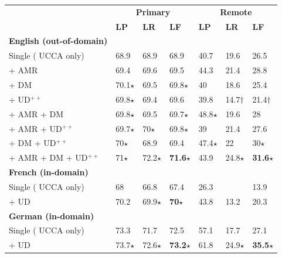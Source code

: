 \documentclass[a0,portrait]{a0poster}
\begin{document}
\begin{multicols}{2}
\begin{center}
\vspace{-1cm}
\setlength\tabcolsep{1cm}
\begin{tabular}{l|lll|lll}
& \multicolumn{3}{c|}{\bf\small Primary} & \multicolumn{3}{c}{\bf\small Remote} \\
& \textbf{\small LP} & \textbf{\small LR} & \textbf{LF}
& \textbf{\small LP} & \textbf{\small LR} & \textbf{LF} \\
\hline
\bf English (out-of-domain) & \\
Single ({\color{Indigo} UCCA} only)
& 68.9 & 68.9 & \large 68.9 & 40.7 & 19.6 & \large 26.5 \\
\cline{1-1}
+ \color{DarkGreen} AMR
& 69.4 & 69.6 & \large 69.5 & 44.3 & 21.4 & \large 28.8 \\
+ \color{DarkRed} DM
& 70.1$\star$ & 69.5 & {\large 69.8}$\star$ & 40 & 18.6 & \large 25.4 \\
+ \color{DarkBlue} UD$^{++}$
& 69.8$\star$ & 69.4 & \large 69.6 & 39.8 & 14.7$\dagger$ & {\large 21.4}$\dagger$ \\
+ {\color{DarkGreen} AMR} + \color{DarkRed} DM
& 69.8$\star$ & 69.5 & {\large 69.7}$\star$ & 48.8$\star$ & 19.6 & \large 28 \\
+ {\color{DarkGreen} AMR} + \color{DarkBlue} UD$^{++}$
& 69.7$\star$ & 70$\star$ & {\large 69.8}$\star$ & 39 & 21.4 & \large 27.6 \\
+ {\color{DarkRed} DM} + \color{DarkBlue} UD$^{++}$
& 70$\star$ & 68.9 & \large 69.4 & 47.4$\star$ & 22 & {\large 30}$\star$ \\
+ {\color{DarkGreen} AMR} + {\color{DarkRed} DM} + \color{DarkBlue} UD$^{++}$
& 71$\star$ & 72.2$\star$ & {\large \textbf{71.6}}$\star$ & 43.9 & 24.8$\star$ & {\large \textbf{31.6}}$\star$ \\
\hline
\bf French (in-domain) & \\
Single ({\color{Indigo} UCCA} only) & 68 & 66.8 & \large 67.4 & 26.3 & \enskip 9.4 & \large 13.9 \\
+ \color{DarkBlue} UD & 70.2 & 69.9$\star$ & {\large \textbf{70}}$\star$ & 43.8 & 13.2 & \large 20.3 \\
\hline
\bf German (in-domain) & \\
Single ({\color{Indigo} UCCA} only) & 73.3 & 71.7 & \large 72.5 & 57.1 & 17.7 & \large 27.1 \\
+ \color{DarkBlue} UD & 73.7$\star$ & 72.6$\star$ & {\large \textbf{73.2}}$\star$ & 61.8 & 24.9$\star$ & {\large \textbf{35.5}}$\star$
\end{tabular}
\end{center}


\end{multicols}
\end{document}
